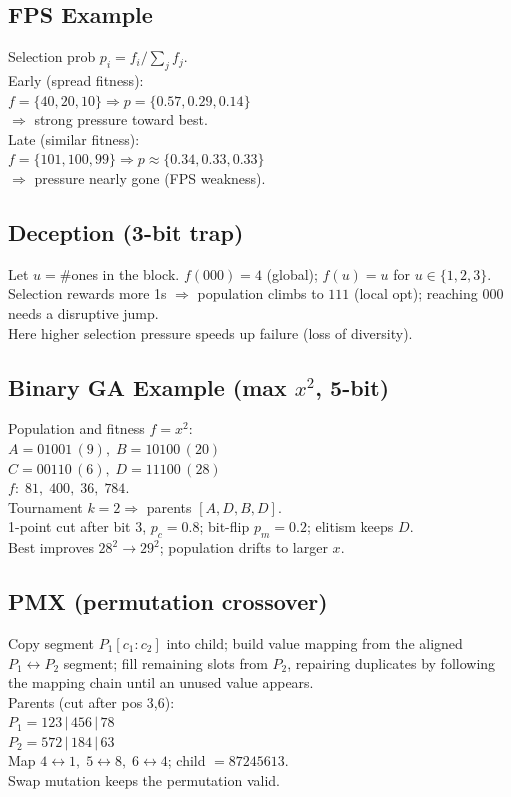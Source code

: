 \subsection*{FPS Example}
Selection prob \(p_i=f_i/\sum_j f_j\).\\
Early (spread fitness):\\
\(f=\{40,20,10\}\Rightarrow p=\{0.57,0.29,0.14\}\)\\
\(\Rightarrow\) strong pressure toward best.\\
Late (similar fitness):\\
\(f=\{101,100,99\}\Rightarrow p\approx\{0.34,0.33,0.33\}\)\\
\(\Rightarrow\) pressure nearly gone (FPS weakness).

\subsection*{Deception (3-bit trap)}
Let \(u=\#\)ones in the block. \(f(000)=4\) (global); \(f(u)=u\) for \(u\in\{1,2,3\}\).\\
Selection rewards more 1s \(\Rightarrow\) population climbs to \(111\) (local opt); reaching \(000\) needs a disruptive jump.\\
Here higher selection pressure speeds up failure (loss of diversity).

\subsection*{Binary GA Example (max \(x^2\), 5-bit)}
Population and fitness \(f=x^2\):\\
\(A{=}01001\,(9),\; B{=}10100\,(20)\)\\
\(C{=}00110\,(6),\; D{=}11100\,(28)\)\\
\(f:\;81,\;400,\;36,\;784\).\\
Tournament \(k{=}2\Rightarrow\) parents \([A,D,B,D]\).\\
1-point cut after bit 3, \(p_c{=}0.8\); bit-flip \(p_m{=}0.2\); elitism keeps \(D\).\\
Best improves \(28^2\!\to\!29^2\); population drifts to larger \(x\).

\subsection*{PMX (permutation crossover)}
Copy segment \(P_1[c_1{:}c_2]\) into child; build value mapping from the aligned \(P_1\leftrightarrow P_2\) segment; fill remaining slots from \(P_2\), repairing duplicates by following the mapping chain until an unused value appears.\\
Parents (cut after pos 3,6):\\
\(P_1=123\,|\,456\,|\,78\)\\
\(P_2=572\,|\,184\,|\,63\)\\
Map \(4{\leftrightarrow}1,\;5{\leftrightarrow}8,\;6{\leftrightarrow}4\); child \(=87245613\).\\
Swap mutation keeps the permutation valid.


